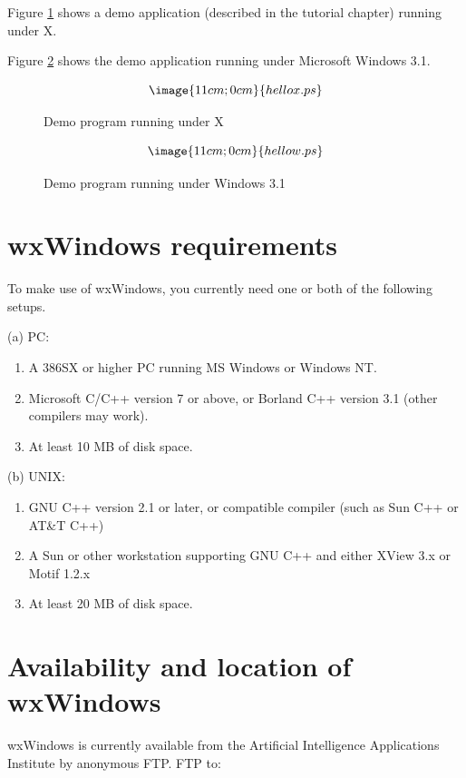 Figure \ref{demox} shows a demo application (described in the tutorial chapter)
running under X.

Figure \ref{demoms} shows the demo application running under Microsoft Windows 3.1.

\begin{figure}
$$\image{11cm;0cm}{hellox.ps}$$
\caption{Demo program running under X}\label{demox}
\end{figure}

\begin{figure}
$$\image{11cm;0cm}{hellow.ps}$$
\caption{Demo program running under Windows 3.1}\label{demoms}
\end{figure}

\section{wxWindows requirements}\label{requirements}

To make use of wxWindows, you currently need one or both of the
following setups.

(a) PC:

\begin{enumerate}\itemsep=0pt
\item A 386SX or higher PC running MS Windows or Windows NT.
\item Microsoft C/C++ version 7 or above, or Borland C++
version 3.1 (other compilers may work).
\item At least 10 MB of disk space.
\end{enumerate}

(b) UNIX:

\begin{enumerate}\itemsep=0pt
\item GNU C++ version 2.1 or later, or compatible compiler (such as
Sun C++ or AT\&T C++)
\item A Sun or other workstation supporting GNU C++ and either XView 3.x
or Motif 1.2.x
\item At least 20 MB of disk space.
\end{enumerate}

\section{Availability and location of wxWindows}

wxWindows is currently available from the Artificial Intelligence
Applications Institute by anonymous FTP. FTP to:

